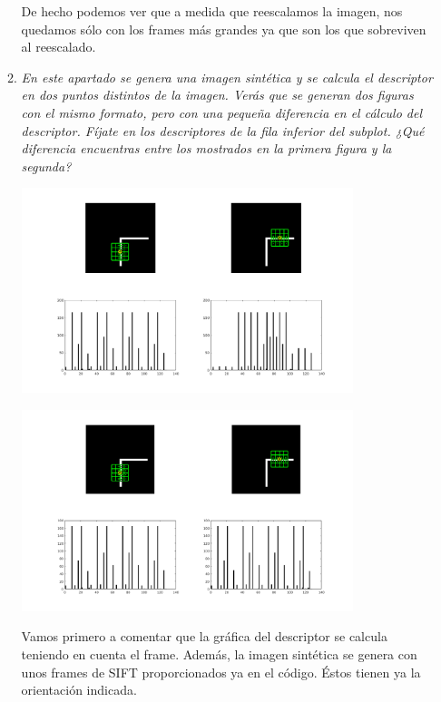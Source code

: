 \documentclass{article}
\begin{document}
\begin{enumerate}
\begin{enumerate}
De hecho podemos ver que a medida que reescalamos la imagen, nos quedamos sólo con los frames más grandes ya que son los que sobreviven al reescalado.

 \item \textit{En este apartado se genera una imagen sintética y se calcula el descriptor 
en dos puntos distintos de la imagen.  Verás  que  se generan dos  figuras 
con el mismo  formato, pero con una pequeña diferencia en el cálculo del 
descriptor.  Fíjate  en los  descriptores  de la  fila inferior  del subplot.  ¿Qué 
diferencia  encuentras  entre  los  mostrados  en  la  primera  figura  y  la 
segunda?}

\begin{center}
	\includegraphics[width=0.8\textwidth]{ej34d1.png}
\end{center}

\begin{center}
	\includegraphics[width=0.8\textwidth]{ej34d2.png}
\end{center}

Vamos primero a comentar que la gráfica del descriptor se calcula teniendo en cuenta el frame. Además, la imagen sintética se genera con unos frames de SIFT proporcionados ya en el código. Éstos tienen ya la orientación indicada.


\end{enumerate}
\end{enumerate}
\end{document}
